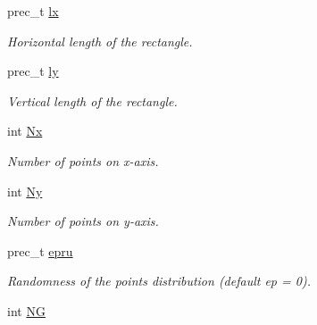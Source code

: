 \begin{CompactItemize}
\item 
\hypertarget{classRectBlocksKnots_81a6725faf7960e44760986ffb54f929}{
prec\_\-t \hyperlink{classRectBlocksKnots_81a6725faf7960e44760986ffb54f929}{lx}}
\label{classRectBlocksKnots_81a6725faf7960e44760986ffb54f929}

\begin{CompactList}\small\item\em Horizontal length of the rectangle. \item\end{CompactList}\item 
\hypertarget{classRectBlocksKnots_d6953d80754ddd30ad929825dd32c269}{
prec\_\-t \hyperlink{classRectBlocksKnots_d6953d80754ddd30ad929825dd32c269}{ly}}
\label{classRectBlocksKnots_d6953d80754ddd30ad929825dd32c269}

\begin{CompactList}\small\item\em Vertical length of the rectangle. \item\end{CompactList}\item 
\hypertarget{classRectBlocksKnots_26f12e6a350d2d4f848fb5c1ed216207}{
int \hyperlink{classRectBlocksKnots_26f12e6a350d2d4f848fb5c1ed216207}{Nx}}
\label{classRectBlocksKnots_26f12e6a350d2d4f848fb5c1ed216207}

\begin{CompactList}\small\item\em Number of points on x-axis. \item\end{CompactList}\item 
\hypertarget{classRectBlocksKnots_5c91a97452e8c451bafda6f352397d0a}{
int \hyperlink{classRectBlocksKnots_5c91a97452e8c451bafda6f352397d0a}{Ny}}
\label{classRectBlocksKnots_5c91a97452e8c451bafda6f352397d0a}

\begin{CompactList}\small\item\em Number of points on y-axis. \item\end{CompactList}\item 
\hypertarget{classRectBlocksKnots_75bc0b7d9b88c35ab01c791bf7b05fae}{
prec\_\-t \hyperlink{classRectBlocksKnots_75bc0b7d9b88c35ab01c791bf7b05fae}{epru}}
\label{classRectBlocksKnots_75bc0b7d9b88c35ab01c791bf7b05fae}

\begin{CompactList}\small\item\em Randomness of the points distribution (default ep = 0). \item\end{CompactList}\item 
\hypertarget{classRectBlocksKnots_91db935e4ee8772c7a72f80d187c2b1f}{
int \hyperlink{classRectBlocksKnots_91db935e4ee8772c7a72f80d187c2b1f}{NG}}
\label{classRectBlocksKnots_91db935e4ee8772c7a72f80d187c2b1f}


\end{CompactItemize}
